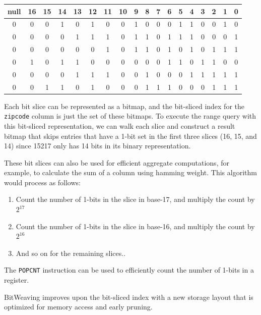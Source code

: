 \documentclass[11pt]{article}
\begin{document}
\begin{table}[!htbp]
\begin{tabular} {|c|c|c|c|c|c|c|c|c|c|c|c|c|c|c|c|c|c|}
\hline
\rowcolor{headerColor2}
null & 16 & 15 & 14 & 13 & 12 & 11 & 10 & 9 & 8 & 7 & 6 & 5 & 4 & 3 & 2 & 1 & 0 \\
\hline
0 & 0 & 0 & 1 & 0 & 1 & 0 & 0 & 1 & 0 & 0 & 0 & 1 & 1 & 0 & 0 & 1 & 0 \\
\hline
0 & 0 & 0 & 0 & 1 & 1 & 1 & 0 & 1 & 1 & 0 & 1 & 1 & 1 & 0 & 0 & 0 & 1 \\
\hline
0 & 0 & 0 & 0 & 0 & 0 & 1 & 0 & 1 & 1 & 0 & 1 & 0 & 1 & 0 & 1 & 1 & 1 \\
\hline
0 & 1 & 0 & 1 & 1 & 0 & 0 & 0 & 0 & 0 & 0 & 1 & 1 & 0 & 1 & 1 & 0 & 0 \\
\hline
0 & 0 & 0 & 0 & 1 & 1 & 1 & 0 & 0 & 1 & 0 & 0 & 0 & 1 & 1 & 1 & 1 & 1 \\
\hline
0 & 0 & 1 & 1 & 0 & 1 & 0 & 0 & 0 & 1 & 1 & 1 & 0 & 0 & 0 & 1 & 1 & 1 \\
\hline
\end{tabular}
\end{table}
Each bit slice can be represented as a bitmap, and the bit-sliced index for the \texttt{zipcode} column is just the set of these bitmaps. To execute the range query with this bit-sliced representation, we can walk each slice and construct a result bitmap that skips entries that have a 1-bit set in the first three slices (16, 15, and 14) since 15217 only has 14 bits in its binary representation.

These bit slices can also be used for efficient aggregate computations, for example, to calculate the sum of a column using hamming weight. This algorithm would process as follows:
\begin{enumerate}
    \item Count the number of 1-bits in the slice in base-17, and multiply the count by $2^{17}$
    \item Count the number of 1-bits in the slice in base-16, and multiply the count by $2^{16}$
    \item And so on for the remaining slices..
\end{enumerate}
The \texttt{POPCNT} instruction can be used to efficiently count the number of 1-bits in a register.

BitWeaving improves upon the bit-sliced index with a new storage layout that is optimized for memory access and early pruning.
\end{document}
